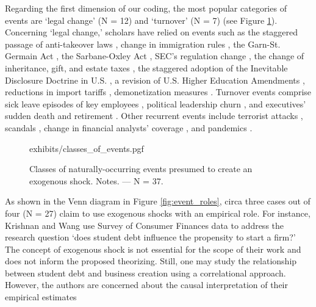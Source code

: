 \documentclass[11pt]{article}
\begin{document}
\begin{refsection}
Regarding the first dimension of our coding, the most popular categories of 
events are `legal change' (N = 12) and `turnover' (N = 7) (see Figure 
\ref{fig:classes_of_events}). Concerning `legal change,' scholars have relied on
events such as the staggered passage of anti-takeover laws 
\autocite{cabral202128,wang20162393}, change in immigration rules 
\autocite{choudhury2019203}, the Garn-St. Germain Act \autocite{haveman2001253},
the Sarbane-Oxley Act \autocite{gupta2020802}, SEC's regulation change
\autocite{jia2020290}, the change of inheritance, gift, and estate taxes
\autocite{kang20201300}, the staggered adoption of the Inevitable Disclosure
Doctrine in U.S. \autocite{kang20201300}, a revision of U.S. Higher Education
Amendments \autocite{krishnan20194522}, reductions in import tariffs
\autocite{li20194011}, demonetization measures \autocite{natarajan20191070}.
Turnover events comprise sick leave episodes of key employees
\autocite{chen20181239,drexler20142722,chown2015177,}, political leadership
churn \autocite{birhanu2020,byun20191368}, and executives' sudden death 
\autocite{ke2019439,he20221512} and retirement \autocite{he20221512}. Other recurrent events include terrorist attacks
\autocite{corbo2016323,vergne20121027,li20194011,bastardoz2022}, scandals
\autocite{cai2019159,hilary2021}, change in financial analysts' coverage
\autocite{chatterji2010917,qian20192271}, and pandemics 
\autocite{garretsen2022,jo20211267}.

\vspace{2em}

\begin{figure}[!htbp]
    \centering
    {exhibits/classes_of_events.pgf}
    \caption{Classes of naturally-occurring events presumed to create an
    exogenous shock. Notes. --- N = 37.}
    \label{fig:classes_of_events}
\end{figure}

\vspace{2em}

As shown in the Venn diagram in Figure \ref{fig:event_roles}, circa three
cases out of four (N = 27) claim to use exogenous shocks with
an empirical role. For instance, Krishnan and Wang \autocite*{krishnan20194522}
use Survey of Consumer Finances data to address the research question `does
student debt influence the propensity to start a firm?'  The concept of
exogenous shock is not essential for the scope of their work and does not inform
the proposed theorizing. Still, one may study the relationship
between student debt and business creation using a correlational approach.
However, the authors are concerned about the causal
interpretation of their empirical estimates


\end{refsection}
\end{document}

